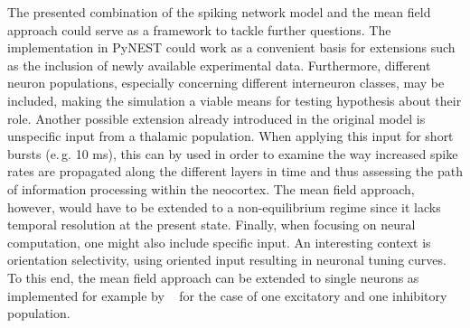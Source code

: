 The presented combination of the spiking network model and the mean field approach
could serve as a framework to tackle further questions. 
The implementation in PyNEST could work as a convenient basis for extensions 
such as the inclusion of newly available experimental data.
Furthermore, different neuron populations, 
especially concerning different interneuron classes, may be included, 
making the simulation a viable means for testing hypothesis about their 
role. 
Another possible extension already introduced in the 
original model \cite{potjans2014} is unspecific input from a thalamic population. 
When applying this input for short bursts (e.\,g. 10 ms), 
this can by used in order to examine the way
increased spike rates are propagated 
along the different layers in time and thus assessing the 
path of information processing within the neocortex.
The mean field approach, however, would have to be extended to a non-equilibrium 
regime since it lacks temporal resolution at the present state. 
Finally, when focusing on neural computation, one might also include specific input.
An interesting context is orientation selectivity, using 
oriented input resulting in neuronal tuning curves.
To this end, the mean field approach can be extended to single neurons 
as implemented for example by ~ 
for the case of one excitatory and one inhibitory population.




